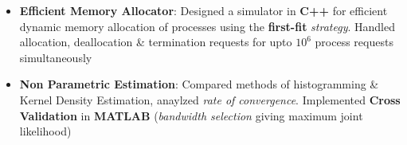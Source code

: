 \documentclass{article}
\begin{document}
\begin{itemize}[itemsep = -1.25 mm, leftmargin=*]
\item \textbf{Efficient Memory Allocator}: Designed a simulator in \textbf{C++} for efficient dynamic memory allocation of processes using\vspace{-0.25mm} the \textbf{first-fit} {\it strategy}. Handled allocation, deallocation \& termination requests for upto $10^{\text{6}}$ process requests simultaneously
\item \textbf{Non Parametric Estimation}: Compared methods of histogramming \& Kernel Density Estimation, anaylzed \textit{rate of convergence}. Implemented \textbf{Cross Validation} in \textbf{MATLAB} (\textit{bandwidth selection} giving maximum joint likelihood)%
\end{itemize}
\end{document}
